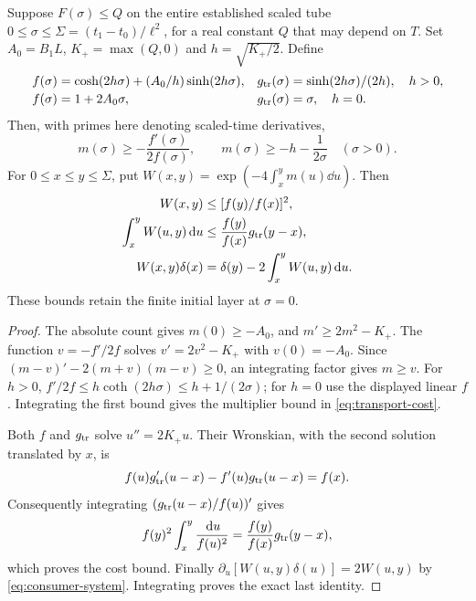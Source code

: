 \begin{theorem}\label{thm:transport}
Suppose $F(\sigma)\le Q$ on the entire established scaled tube
$0\le\sigma\le\Sigma=(t_1-t_0)/\ell^2$, for a real constant $Q$
that may depend on $T$.
Set $A_0=B_1L$, $K_+=\max(Q,0)$ and $h=\sqrt{K_+/2}$. Define
\begin{equation}
 \begin{array}{ll}
 f(\sigma)=\cosh(2h\sigma)+(A_0/h)\sinh(2h\sigma),&
 g_{\rm tr}(\sigma)=\sinh(2h\sigma)/(2h),\quad h>0,\\[2pt]
 f(\sigma)=1+2A_0\sigma,&g_{\rm tr}(\sigma)=\sigma,\quad h=0.
 \end{array}
 \label{eq:comparison-functions}
\end{equation}
Then, with primes here denoting scaled-time derivatives,
\begin{equation}
 m(\sigma)\ge-\frac{f'(\sigma)}{2f(\sigma)},\qquad
 m(\sigma)\ge-h-\frac1{2\sigma}\quad(\sigma>0).
 \label{eq:riccati-barrier}
\end{equation}
For $0\le x\le y\le\Sigma$, put
$W(x,y)=\exp(-4\int_x^y m(u)\dd u)$. Then
\begin{equation}
 \begin{split}
 W(x,y)&\le[f(y)/f(x)]^2,\\
 \int_x^y W(u,y)\,\mathrm d u&\le\frac{f(y)}{f(x)}g_{\rm tr}(y-x),\\
 W(x,y)\delta(x)&=\delta(y)-2\int_x^y W(u,y)\,\mathrm d u.
 \end{split}
 \label{eq:transport-cost}
\end{equation}
These bounds retain the finite initial layer at $\sigma=0$.
\end{theorem}

\begin{proof}
The absolute count gives $m(0)\ge-A_0$, and
$m'\ge2m^2-K_+$. The function $v=-f'/2f$ solves
$v'=2v^2-K_+$ with $v(0)=-A_0$. Since
$(m-v)'-2(m+v)(m-v)\ge0$, an integrating factor gives $m\ge v$.
For $h>0$, $f'/2f\le h\coth(2h\sigma)\le h+1/(2\sigma)$;
for $h=0$ use the displayed linear $f$. Integrating the first bound
gives the multiplier bound in \eqref{eq:transport-cost}.

Both $f$ and $g_{\rm tr}$ solve $u''=2K_+u$. Their Wronskian,
with the second solution translated by $x$, is
\[
 f(u)g_{\rm tr}'(u-x)-f'(u)g_{\rm tr}(u-x)=f(x).
\]
Consequently integrating $(g_{\rm tr}(u-x)/f(u))'$ gives
\[
 f(y)^2\int_x^y\frac{\,\mathrm d u}{f(u)^2}
        =\frac{f(y)}{f(x)}g_{\rm tr}(y-x),
\]
which proves the cost bound. Finally
$\partial_u[W(u,y)\delta(u)]=2W(u,y)$ by
\eqref{eq:consumer-system}. Integrating proves the exact last identity.
\end{proof}

